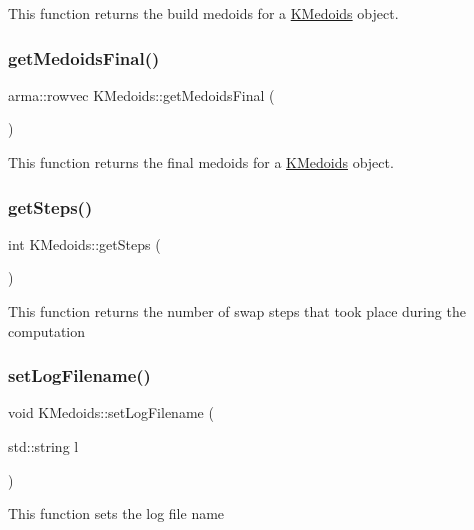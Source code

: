 This function returns the build medoids for a \hyperlink{classKMedoids}{K\+Medoids} object. \mbox{\label{classKMedoids_a26aa9827d2541626d959dc984f0f9bcb}} 
\subsubsection{\texorpdfstring{get\+Medoids\+Final()}{getMedoidsFinal()}}
{\footnotesize\ttfamily arma\+::rowvec K\+Medoids\+::get\+Medoids\+Final (\begin{DoxyParamCaption}{ }\end{DoxyParamCaption})}

This function returns the final medoids for a \hyperlink{classKMedoids}{K\+Medoids} object. \mbox{\label{classKMedoids_a2c8d55468ebe909229ea7bcdb50e8351}} 
\subsubsection{\texorpdfstring{get\+Steps()}{getSteps()}}
{\footnotesize\ttfamily int K\+Medoids\+::get\+Steps (\begin{DoxyParamCaption}{ }\end{DoxyParamCaption})}

This function returns the number of swap steps that took place during the computation \mbox{\label{classKMedoids_a70de4f833f95a0256cce42284ebb3d48}} 
\subsubsection{\texorpdfstring{set\+Log\+Filename()}{setLogFilename()}}
{\footnotesize\ttfamily void K\+Medoids\+::set\+Log\+Filename (\begin{DoxyParamCaption}\item[{std\+::string}]{l }\end{DoxyParamCaption})}

This function sets the log file name \mbox{\label{classKMedoids_ab442bf7198be7a48a7eb5901ac7ca571}} 
